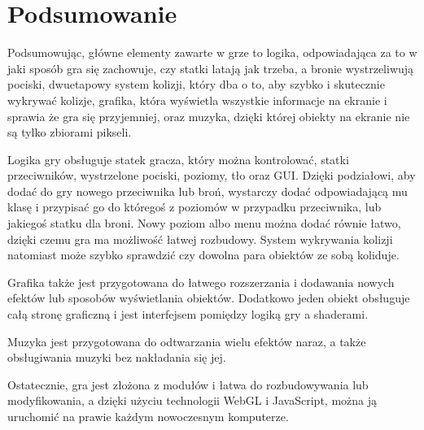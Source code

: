 \chapter{Podsumowanie}
\thispagestyle{chapterBeginStyle}
\label{ch:outro}

Podsumowując, główne elementy zawarte w grze to logika, odpowiadająca za to w jaki sposób gra się zachowuje, czy statki latają jak trzeba, a bronie wystrzeliwują pociski, dwuetapowy system kolizji, który dba o to, aby szybko i skutecznie wykrywać kolizje, grafika, która wy\'swietla wszystkie informacje na ekranie i sprawia że gra się przyjemniej, oraz muzyka, dzięki której obiekty na ekranie nie są tylko zbiorami pikseli.\bigskip

Logika gry obsługuje statek gracza, który można kontrolować, statki przeciwników, wystrzelone pociski, poziomy, tło oraz GUI. Dzięki podziałowi, aby dodać do gry nowego przeciwnika lub broń, wystarczy dodać odpowiadającą mu klasę i przypisać go do którego\'s z poziomów w przypadku przeciwnika, lub jakiego\'s statku dla broni. Nowy poziom albo menu można dodać równie łatwo, dzięki czemu gra ma możliwo\'sć łatwej rozbudowy. System wykrywania kolizji natomiast może szybko sprawdzić czy dowolna para obiektów ze sobą koliduje.\bigskip

Grafika także jest przygotowana do łatwego rozszerzania i dodawania nowych efektów lub sposobów wy\'swietlania obiektów. Dodatkowo jeden obiekt obsługuje całą stronę graficzną i jest interfejsem pomiędzy logiką gry a shaderami.\bigskip

Muzyka jest przygotowana do odtwarzania wielu efektów naraz, a także obsługiwania muzyki bez nakładania się jej.\bigskip

Ostatecznie, gra jest złożona z modułów i łatwa do rozbudowywania lub modyfikowania, a dzięki użyciu technologii WebGL i JavaScript, można ją uruchomić na prawie każdym nowoczesnym komputerze.
\cleardoublepage
